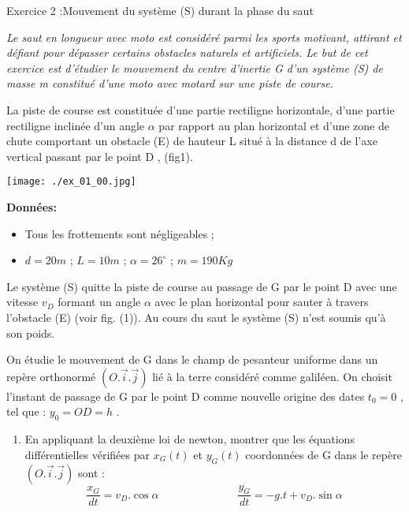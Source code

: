 \documentclass[12pt, french]{article}
\begin{document}
\begin{Box2}{Exercice 2 :Mouvement du système (S) durant la phase du saut }

	\emph{Le saut en longueur avec moto est considéré parmi les sports motivant, attirant et défiant pour
dépasser certains obstacles naturels et artificiels.
Le but de cet exercice est d’étudier le mouvement du centre d’inertie G d’un système (S) de
masse m constitué d’une moto avec motard sur une piste de course.}

La piste de course est constituée d’une partie rectiligne horizontale, d’une partie rectiligne inclinée d’un
angle $\alpha$ par rapport au plan horizontal et d’une zone de chute comportant un obstacle (E) de
hauteur L situé à la distance d de l’axe vertical passant par le point D , (fig1).

\begin{center}
	\texttt{[image: ./ex\_01\_00.jpg]}
  \end{center}

	\vspace{-1.8cm}
\textbf{Données:}
\begin{itemize}
	\item Tous les frottements sont négligeables ;
	\item  $d=20m$ ; $L=10m$ ; $\alpha = 26^{\circ}$ ; $m=190Kg$
\end{itemize}
Le système (S) quitte la piste de course au passage de G par le point D avec une vitesse $v_D$ formant un
angle $\alpha$ avec le plan horizontal pour sauter à travers l’obstacle (E) (voir fig. (1)). Au cours du saut le
système (S) n’est soumis qu’à son poids.

On étudie le mouvement de G dans le champ de pesanteur uniforme dans un repère orthonormé
$(O.\vec{i}.\vec{j})$ lié à la terre considéré comme galiléen. On choisit l’instant de passage de G par le point
D comme nouvelle origine des dates $t_0 = 0$ , tel que : $y_0 = OD = h$ .
\begin{enumerate}
	\item En appliquant la deuxième loi de newton, montrer que les équations différentielles vérifiées par $x_G (t)$ et $y_G (t)$ coordonnées de G dans le repère $(O.\vec{i}.\vec{j})$ sont : $$\frac{x_G}{dt} = v_D.\cos{\alpha} \hspace{3cm} \frac{y_G}{dt} = -g.t +v_D.\sin{\alpha}$$


\end{enumerate}
\end{Box2}
\end{document}
